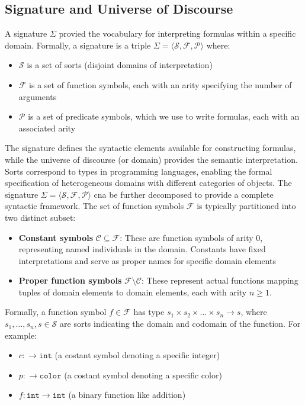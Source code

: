 \documentclass[a4paper]{article}
\theoremstyle{definition}
\begin{document}
\subsection{Signature and Universe of Discourse}
A signature \( \Sigma \) provied the vocabulary for interpreting formulas within a specific domain. Formally, a signature is 
a triple \( \Sigma = \langle \mathcal{S}, \mathcal{F}, \mathcal{P} \rangle \) where:
\begin{itemize}
	\item \( \mathcal{S} \) is a set of sorts (disjoint domains of interpretation)
	\item \( \mathcal{F} \) is a set of function symbols, each with an arity specifying the number of arguments 
	\item \( \mathcal{P} \) is a set of predicate symbols, which we use to write formulas, each with an associated arity 
\end{itemize}
The signature defines the syntactic elements available for constructing formulas, while the universe of discourse (or domain) provides 
the semantic interpretation. Sorts correspond to types in programming languages, enabling the formal specification of heterogeneous 
domains with different categories of objects.
\vspace{1em}
\noindent
\newline
The signature \( \Sigma = \langle \mathcal{S}, \mathcal{F}, \mathcal{P} \rangle \) cna be further decomposed to provide a complete syntactic 
framework. The set of function symbols \( \mathcal{F} \) is typically partitioned into two distinct subset:
\begin{itemize}
	\item \textbf{Constant symbols} \( \mathcal{C} \subseteq \mathcal{F} \): These are function symbols of arity 0, representing 
		named individuals in the domain. Constants have fixed interpretations and serve as proper names for specific domain elements 
	\item \textbf{Proper function symbols} \( \mathcal{F} \setminus \mathcal{C} \): These represent actual functions mapping tuples 
		of domain elements to domain elements, each with arity \( n \geq 1 \).
\end{itemize}
Formally, a function symbol \( f \in \mathcal{F} \) has type \( s_1 \times s_2 \times \ldots \times s_n \rightarrow s \), where 
\( s_1, \ldots, s_n, s \in \mathcal{S} \) are sorts indicating the domain and codomain of the function. For example:
\begin{itemize}
	\item \( c :\rightarrow \texttt{int} \) (a costant symbol denoting a specific integer)
	\item \( p :\rightarrow \texttt{color} \) (a costant symbol denoting a specific color)
	\item \( f : \texttt{int} \rightarrow \texttt{int} \) (a binary function like addition)
\end{itemize}
\end{document}
